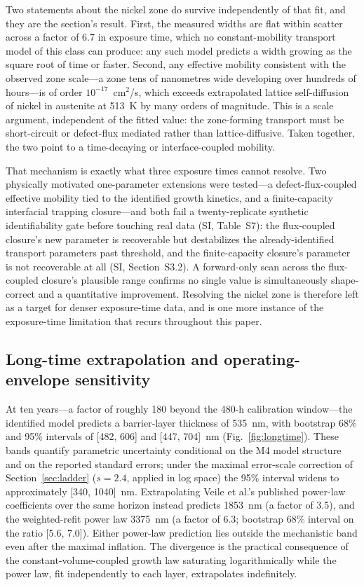 \documentclass[preprint,12pt]{elsarticle}
\begin{document}
Two statements about the nickel zone do survive independently of that
fit, and they are the section's result. First, the measured widths are
flat within scatter across a factor of 6.7 in exposure time, which no
constant-mobility transport model of this class can produce: any such
model predicts a width growing as the square root of time or faster.
Second, any effective mobility consistent with the observed zone
scale---a zone tens of nanometres wide developing over hundreds of
hours---is of order $10^{-17}$~cm$^2$/s, which exceeds extrapolated
lattice self-diffusion of nickel in austenite at 513~K by many orders of
magnitude. This is a scale argument, independent of the fitted value: the
zone-forming transport must be short-circuit or defect-flux mediated
rather than lattice-diffusive. Taken together, the two point to a
time-decaying or interface-coupled mobility.

That mechanism is exactly what three exposure times cannot resolve. Two
physically motivated one-parameter extensions were tested---a
defect-flux-coupled effective mobility tied to the identified growth
kinetics, and a finite-capacity interfacial trapping closure---and both
fail a twenty-replicate synthetic identifiability gate before touching
real data (SI, Table~S7): the flux-coupled closure's new parameter is
recoverable but destabilizes the already-identified transport parameters
past threshold, and the finite-capacity closure's parameter is not
recoverable at all (SI, Section~S3.2). A forward-only scan across the
flux-coupled closure's plausible range confirms no single value is
simultaneously shape-correct
and a quantitative improvement. Resolving the nickel zone is therefore
left as a target for denser exposure-time data, and is one more instance
of the exposure-time limitation that recurs throughout this paper.

\subsection{Long-time extrapolation and operating-envelope sensitivity}\label{sec:predictions}

At ten years---a factor of roughly 180 beyond the 480-h calibration
window---the identified model predicts a barrier-layer thickness of
535~nm, with bootstrap 68\% and 95\% intervals of [482, 606] and [447,
704]~nm (Fig.~\ref{fig:longtime}). These bands quantify parametric
uncertainty conditional on the M4 model structure and on the reported
standard errors; under the maximal error-scale correction of
Section~\ref{sec:ladder} ($s = 2.4$, applied in log space) the 95\%
interval widens to approximately [340, 1040]~nm. Extrapolating Veile
et al.'s published power-law coefficients over the same horizon instead
predicts 1853~nm (a factor of 3.5), and the weighted-refit power law
3375~nm (a factor of 6.3; bootstrap 68\% interval on the ratio [5.6,
7.0]). Either power-law prediction lies outside the mechanistic band
even after the maximal inflation. The divergence is the practical
consequence of the constant-volume-coupled growth law saturating
logarithmically while the power law, fit independently to each layer,
extrapolates indefinitely.
\end{document}
